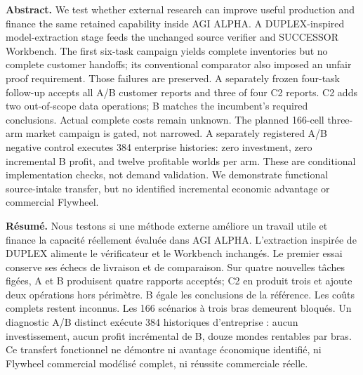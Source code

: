 {\small
\textbf{Abstract.}
We test whether external research can improve useful production and finance the same retained capability inside AGI ALPHA. A DUPLEX-inspired model-extraction stage feeds the unchanged source verifier and SUCCESSOR Workbench. The first six-task campaign yields complete inventories but no complete customer handoffs; its conventional comparator also imposed an unfair proof requirement. Those failures are preserved. A separately frozen four-task follow-up accepts all A/B customer reports and three of four C2 reports. C2 adds two out-of-scope data operations; B matches the incumbent's required conclusions. Actual complete costs remain unknown. The planned 166-cell three-arm market campaign is gated, not narrowed. A separately registered A/B negative control executes 384 enterprise histories: zero investment, zero incremental B profit, and twelve profitable worlds per arm. These are conditional implementation checks, not demand validation. We demonstrate functional source-intake transfer, but no identified incremental economic advantage or commercial Flywheel.

\medskip
\textbf{Résumé.}
Nous testons si une méthode externe améliore un travail utile et finance la capacité réellement évaluée dans AGI ALPHA. L’extraction inspirée de DUPLEX alimente le vérificateur et le Workbench inchangés. Le premier essai conserve ses échecs de livraison et de comparaison. Sur quatre nouvelles tâches figées, A et B produisent quatre rapports acceptés; C2 en produit trois et ajoute deux opérations hors périmètre. B égale les conclusions de la référence. Les coûts complets restent inconnus. Les 166 scénarios à trois bras demeurent bloqués. Un diagnostic A/B distinct exécute 384 historiques d’entreprise : aucun investissement, aucun profit incrémental de B, douze mondes rentables par bras. Ce transfert fonctionnel ne démontre ni avantage économique identifié, ni Flywheel commercial modélisé complet, ni réussite commerciale réelle.
}
